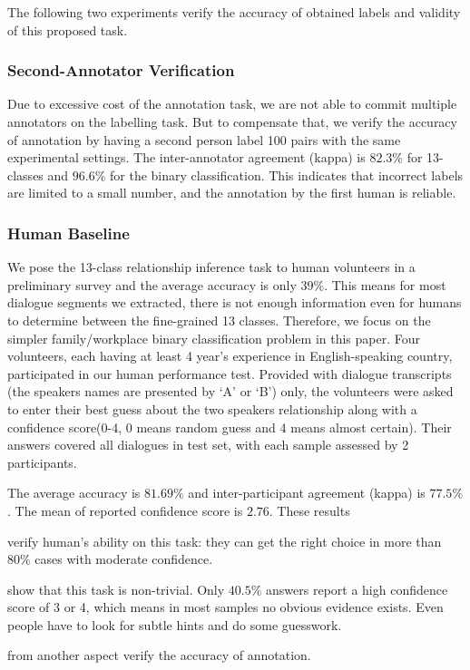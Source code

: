 The following two experiments verify the accuracy of obtained 
labels and validity of this proposed task.

\subsubsection*{Second-Annotator Verification}
Due to excessive cost of the annotation task, 
we are not able to commit multiple annotators on the labelling task. 
But to compensate that, we verify the accuracy of annotation by 
having a second person label 100 pairs with the same experimental settings. 
The inter-annotator agreement (kappa) is $82.3\%$ for 13-classes and $96.6\%$ for 
the binary classification. 
This indicates that incorrect labels are limited to a small number, and the annotation by the first human is 
reliable.


\subsubsection*{Human Baseline}
We pose the 13-class relationship inference task to human volunteers in a preliminary survey and the average accuracy is only $39\%$. This means for most dialogue segments we extracted, there is not enough information even for humans to determine between the fine-grained 13 classes. 
Therefore, we focus on the simpler family/workplace binary 
classification problem in this paper. 
Four volunteers, each having at least 4 year's experience in English-speaking 
country, participated in our human performance test. 
Provided with dialogue transcripts (the speakers 
names are presented by `A' or `B') only, the volunteers were asked to 
enter their best guess about the two speakers relationship along with 
a confidence score(0-4, 0 means random guess and 4 means almost certain). 
Their answers covered all dialogues in test set, 
with each sample assessed by 2 participants.

The average accuracy is $81.69\%$ and  
inter-participant agreement (kappa) is $77.5\%$. 
The mean of reported confidence score is $2.76$. These results 
\begin{compactenum}
	\item verify human's ability on this task: they can get the right choice in more than $80\%$ cases with moderate confidence.
	\item show that this task is non-trivial. Only $40.5\%$ answers report a high confidence score of 3 or 4, 
	which means in most samples no obvious evidence exists.
	Even people have to look for subtle hints and do some guesswork.
	\item from another aspect verify the accuracy of annotation.
\end{compactenum}

